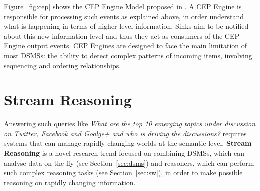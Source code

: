 Figure~\ref{fig:cep} shows the CEP Engine Model proposed in \cite{Cugola:2012:PFI:2187671.2187677}. A CEP Engine is responsible for processing such events as explained above, in order understand what is happening in terms of higher-level information. Sinks aim to    be notified  about this new information level and thus they act as consumers of the CEP Engine output events. 
CEP Engines are designed to face the main limitation of most DSMSs: the ability to detect complex patterns of incoming items, involving sequencing and ordering relationships.

\section{Stream Reasoning}\label{sec:sfp}

Answering such queries like \textit{What are the top 10 emerging topics under discussion on Twitter, Facebook and Goolge+ and who is driving the discussions?} requires systems that can manage rapidly changing worlds at the semantic level. \textbf{Stream Reasoning} is a novel research trend focused on combining DSMSs, which can analyse data on the fly (see Section~\ref{sec:dsms}) and reasoners, which can perform such complex reasoning tasks (see Section~\ref{sec:sw}), in order to make possible reasoning on rapidly changing information.



